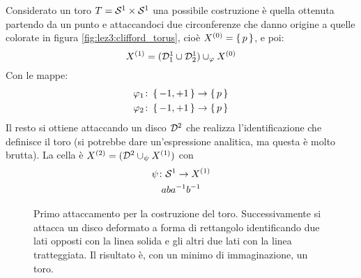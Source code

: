 \begin{example}[Toro]
  Considerato un toro $ T = \mathcal{S}^{1} \times \mathcal{S}^{1} $ una possibile costruzione
  è quella ottenuta partendo da un punto e attaccandoci due circonferenze
  che danno origine a quelle colorate in figura \ref{fig:lez3:clifford_torus},
  cioè $ X^{(0)} = \set{p} $, e poi:
  \[
    X^{(1)} = (\mathcal{D}^{1}_1 \cup \mathcal{D}^{1}_2) \cup_\varphi X^{(0)}
  \]
  Con le mappe:
  \begin{gather*}
    \varphi_1 \colon \set{-1, +1} \to \set{p} \\
    \varphi_2 \colon \set{-1, +1} \to \set{p}
  \end{gather*}
  Il resto si ottiene attaccando un disco $ \mathcal{D}^{2} $ che realizza
  l'identificazione che definisce il toro (si potrebbe dare un'espressione
  analitica, ma questa è molto brutta). La cella è
  $ X^{(2)} = (\mathcal{D}^{2} \cup_\psi X^{(1)}) $ con
  \begin{gather*}
    \psi \colon \mathcal{S}^{1}  \to X^{(1)} \\
    aba^{-1}b^{-1}
  \end{gather*}
  \begin{figure}[htbp]
    \centering
    \caption{Primo attaccamento per la costruzione del toro. Successivamente
      si attacca un disco deformato a forma di rettangolo identificando due lati
      opposti con la linea solida e gli altri due lati con la linea tratteggiata.
      Il risultato è, con un minimo di immaginazione, un toro.}
  \end{figure}
\end{example}

